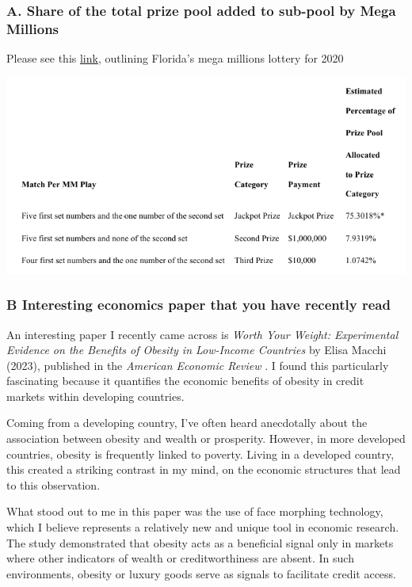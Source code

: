 \documentclass[
  12pt]{article}
\begin{document}
\subsubsection{A. Share of the total prize pool added to sub-pool by
Mega
Millions}\label{a.-share-of-the-total-prize-pool-added-to-sub-pool-by-mega-millions}

Please see this
\href{https://files.floridalottery.com/exptkt/megaMillions-GameRules.pdf}{link},
outlining Florida's mega millions lottery for 2020
\citep{lotteryMEGAMILLIONSGame2020}

\includegraphics{images/8.png}

\subsubsection{B Interesting economics paper that you have recently
read}\label{b-interesting-economics-paper-that-you-have-recently-read}

An interesting paper I recently came across is \emph{Worth Your Weight:
Experimental Evidence on the Benefits of Obesity in Low-Income
Countries} by Elisa Macchi (2023), published in the \emph{American
Economic Review} \citep{macchiWorthYourWeight2023}. I found this
particularly fascinating because it quantifies the economic benefits of
obesity in credit markets within developing countries.

Coming from a developing country, I've often heard anecdotally about the
association between obesity and wealth or prosperity. However, in more
developed countries, obesity is frequently linked to poverty. Living in
a developed country, this created a striking contrast in my mind, on the
economic structures that lead to this observation.

What stood out to me in this paper was the use of face morphing
technology, which I believe represents a relatively new and unique tool
in economic research. The study demonstrated that obesity acts as a
beneficial signal only in markets where other indicators of wealth or
creditworthiness are absent. In such environments, obesity or luxury
goods serve as signals to facilitate credit access.
\end{document}
